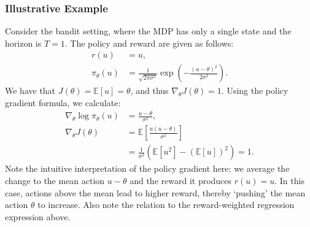 \subsubsection{Illustrative Example}

Consider the bandit setting, where the MDP has only a single state and the horizon is $T=1$. The policy and reward are given as follows:
\begin{equation*}
    \begin{split}
        r(u) &= u, \\
        \pi_\theta(u) &= \frac{1}{\sqrt{2 \pi \sigma^2}} \exp (- \frac{(u - \theta)^2}{2 \sigma^2}).
    \end{split}
\end{equation*}
We have that $J(\theta) = \mathbb{E}[u] = \theta$, and thus $\nabla_\theta J(\theta) = 1.$
Using the policy gradient formula, we calculate:
\begin{equation*}
    \begin{split}
        \nabla_\theta \log \pi_\theta(u) &= \frac{u - \theta}{\sigma^2}, \\
        \nabla_\theta J(\theta) &= \mathbb{E} [\frac{u(u - \theta)}{\sigma^2}] \\
        &= \frac{1}{\sigma^2} (\mathbb{E} [u^2] - (\mathbb{E} [u])^2) = 1.
    \end{split}
\end{equation*}
Note the intuitive interpretation of the policy gradient here: we average the change to the mean action $u-\theta$ and the reward it produces $r(u)=u$. In this case, actions above the mean lead to higher reward, thereby `pushing' the mean action $\theta$ to increase. Also note the relation to the reward-weighted regression expression above.

